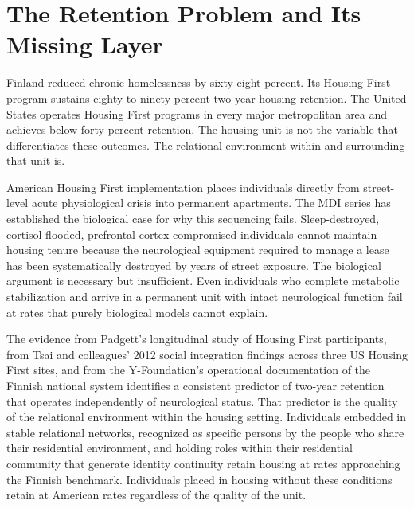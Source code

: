 \documentclass[12pt, letterpaper]{article}
\begin{document}
\newpage
\begingroup
{}
\setlength{\cftbeforesecskip}{2pt}
\setlength{\cftbeforesubsecskip}{-2pt}
\tableofcontents
\endgroup

\newpage
{}

\clearpage
\section{The Retention Problem and Its Missing Layer}

Finland reduced chronic homelessness by sixty-eight percent. Its Housing First program sustains eighty to ninety percent two-year housing retention. The United States operates Housing First programs in every major metropolitan area and achieves below forty percent retention. The housing unit is not the variable that differentiates these outcomes. The relational environment within and surrounding that unit is.

American Housing First implementation places individuals directly from street-level acute physiological crisis into permanent apartments. The MDI series has established the biological case for why this sequencing fails. Sleep-destroyed, cortisol-flooded, prefrontal-cortex-compromised individuals cannot maintain housing tenure because the neurological equipment required to manage a lease has been systematically destroyed by years of street exposure. The biological argument is necessary but insufficient. Even individuals who complete metabolic stabilization and arrive in a permanent unit with intact neurological function fail at rates that purely biological models cannot explain.

The evidence from Padgett's longitudinal study of Housing First participants, from Tsai and colleagues' 2012 social integration findings across three US Housing First sites, and from the Y-Foundation's operational documentation of the Finnish national system identifies a consistent predictor of two-year retention that operates independently of neurological status. That predictor is the quality of the relational environment within the housing setting. Individuals embedded in stable relational networks, recognized as specific persons by the people who share their residential environment, and holding roles within their residential community that generate identity continuity retain housing at rates approaching the Finnish benchmark. Individuals placed in housing without these conditions retain at American rates regardless of the quality of the unit.
\end{document}

